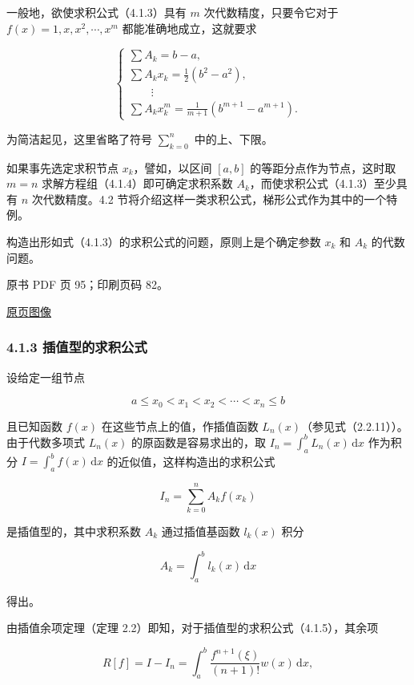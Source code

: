 一般地，欲使求积公式（4.1.3）具有 \(m\) 次代数精度，只要令它对于 \(f(x)=1,x,x^2,\cdots,x^m\) 都能准确地成立，这就要求

\[
\begin{cases}
\displaystyle\sum A_k=b-a,\\[4pt]
\displaystyle\sum A_kx_k=\frac12(b^2-a^2),\\
\qquad\vdots\\
\displaystyle\sum A_kx_k^m=\frac{1}{m+1}(b^{m+1}-a^{m+1}).
\end{cases}
\tag{4.1.4}
\]

为简洁起见，这里省略了符号 \(\displaystyle\sum_{k=0}^n\) 中的上、下限。

如果事先选定求积节点 \(x_k\)，譬如，以区间 \([a,b]\) 的等距分点作为节点，这时取 \(m=n\) 求解方程组（4.1.4）即可确定求积系数 \(A_k\)，而使求积公式（4.1.3）至少具有 \(n\) 次代数精度。4.2 节将介绍这样一类求积公式，梯形公式作为其中的一个特例。

构造出形如式（4.1.3）的求积公式的问题，原则上是个确定参数 \(x_k\) 和 \(A_k\) 的代数问题。

\clearpage

原书 PDF 页 95；印刷页码 82。

\href{source-images/pdf-095.jpeg}{原页图像}

\subsubsection{4.1.3 插值型的求积公式}\label{ch04a-ux63d2ux503cux578bux7684ux6c42ux79efux516cux5f0f}

设给定一组节点

\[
a\leq x_0<x_1<x_2<\cdots<x_n\leq b
\]

且已知函数 \(f(x)\) 在这些节点上的值，作插值函数 \(L_n(x)\)（参见式（2.2.11））。由于代数多项式 \(L_n(x)\) 的原函数是容易求出的，取 \(I_n=\int_a^b L_n(x)\,\mathrm{d}x\) 作为积分 \(I=\int_a^b f(x)\,\mathrm{d}x\) 的近似值，这样构造出的求积公式

\[
I_n=\sum_{k=0}^n A_kf(x_k)
\tag{4.1.5}
\]

是插值型的，其中求积系数 \(A_k\) 通过插值基函数 \(l_k(x)\) 积分

\[
A_k=\int_a^b l_k(x)\,\mathrm{d}x
\tag{4.1.6}
\]

得出。

由插值余项定理（定理 2.2）即知，对于插值型的求积公式（4.1.5），其余项

\[
R[f]=I-I_n=\int_a^b\frac{f^{n+1}(\xi)}{(n+1)!}w(x)\,\mathrm{d}x,
\tag{4.1.7}
\]

